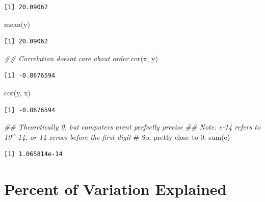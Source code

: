\documentclass[
  letterpaper,
  DIV=11,
  numbers=noendperiod,
  oneside]{scrreprt}
\newenvironment{Shaded}{\begin{snugshade}}{\end{snugshade}}
\newcommand{\CommentTok}[1]{\textcolor[rgb]{0.37,0.37,0.37}{#1}}
\newcommand{\DocumentationTok}[1]{\textcolor[rgb]{0.37,0.37,0.37}{\textit{#1}}}
\newcommand{\FunctionTok}[1]{\textcolor[rgb]{0.28,0.35,0.67}{#1}}
\newcommand{\NormalTok}[1]{\textcolor[rgb]{0.00,0.23,0.31}{#1}}
\begin{document}
\begin{verbatim}
[1] 20.09062
\end{verbatim}

\begin{Shaded}
\begin{Highlighting}[]
\FunctionTok{mean}\NormalTok{(y)}
\end{Highlighting}
\end{Shaded}

\begin{verbatim}
[1] 20.09062
\end{verbatim}

\begin{Shaded}
\begin{Highlighting}[]
\DocumentationTok{\#\# Correlation doesn\textquotesingle{}t care about order}
\FunctionTok{cor}\NormalTok{(x, y)}
\end{Highlighting}
\end{Shaded}

\begin{verbatim}
[1] -0.8676594
\end{verbatim}

\begin{Shaded}
\begin{Highlighting}[]
\FunctionTok{cor}\NormalTok{(y, x)}
\end{Highlighting}
\end{Shaded}

\begin{verbatim}
[1] -0.8676594
\end{verbatim}

\begin{Shaded}
\begin{Highlighting}[]
\DocumentationTok{\#\# Theoretically 0, but computers aren\textquotesingle{}t perfectly precise}
\DocumentationTok{\#\# Note: e{-}14 refers to 10\^{}{-}14, or 14 zeroes before the first digit}
    \CommentTok{\# So, pretty close to 0.}
\FunctionTok{sum}\NormalTok{(e) }
\end{Highlighting}
\end{Shaded}

\begin{verbatim}
[1] 1.065814e-14
\end{verbatim}

\hypertarget{percent-of-variation-explained}{%
\section{Percent of Variation
Explained}\label{percent-of-variation-explained}}
\end{document}
